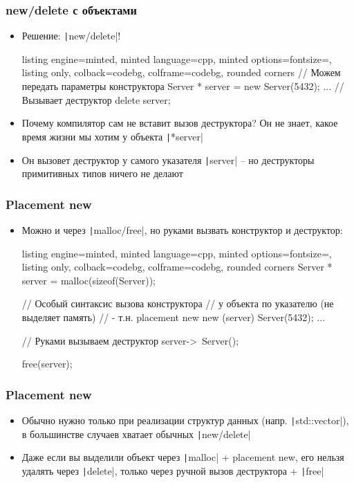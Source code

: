 \documentclass[10pt]{beamer}
\begin{document}
\begin{frame}[fragile]
\frametitle{new/delete с объектами}
\begin{itemize}
\item Решение: \texttt|new/delete|!
\begin{tcblisting}{listing engine=minted, minted language=cpp, minted options={fontsize=\scriptsize}, listing only, colback=codebg, colframe=codebg, rounded corners}
// Можем передать параметры конструктора
Server * server = new Server(5432);
...
// Вызывает деструктор
delete server;
\end{tcblisting}
\pause
{}
\item Почему компилятор сам не вставит вызов деструктора? \pause Он не знает, какое время жизни мы хотим у объекта \texttt|*server|
\pause
\item Он вызовет деструктор у самого указателя \texttt|server| -- но деструкторы примитивных типов ничего не делают
\end{itemize}
\end{frame}

\begin{frame}[fragile]
\frametitle{Placement new}
\begin{itemize}
\item Можно и через \texttt|malloc/free|, но руками вызвать конструктор и деструктор:
\begin{tcblisting}{listing engine=minted, minted language=cpp, minted options={fontsize=\scriptsize}, listing only, colback=codebg, colframe=codebg, rounded corners}
Server * server = malloc(sizeof(Server));

// Особый синтаксис вызова конструктора
// у объекта по указателю (не выделяет память)
// - т.н. placement new
new (server) Server(5432);
...

// Руками вызываем деструктор
server->~Server();

free(server);
\end{tcblisting}
\end{itemize}
\end{frame}

\begin{frame}[fragile]
\frametitle{Placement new}
\begin{itemize}
\item Обычно нужно только при реализации структур данных (напр. \texttt|std::vector|), в большинстве случаев хватает обычных \texttt|new/delete|
\pause
\item Даже если вы выделили объект через \texttt|malloc| + placement new, его нельзя удалять через \texttt|delete|, только через ручной вызов деструктора + \texttt|free|
\end{itemize}
\end{frame}
\end{document}
